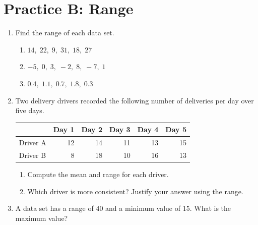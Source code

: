 \section*{Practice B: Range}
\begin{enumerate}[label=B\arabic*.,leftmargin=2.5em,itemsep=10pt]
  \item Find the range of each data set.
    \begin{enumerate}[label=(\alph*), itemsep=4pt]
      \item $14,\; 22,\; 9,\; 31,\; 18,\; 27$
      \item $-5,\; 0,\; 3,\; -2,\; 8,\; -7,\; 1$
      \item $0.4,\; 1.1,\; 0.7,\; 1.8,\; 0.3$
    \end{enumerate}

  \item Two delivery drivers recorded the following number
    of deliveries per day over five days.
    \begin{center}
    \renewcommand{\arraystretch}{1.4}
    \begin{tabular}{lrrrrr}
    \toprule
    & Day 1 & Day 2 & Day 3 & Day 4 & Day 5 \\
    \midrule
    Driver A & 12 & 14 & 11 & 13 & 15 \\
    Driver B & 8  & 18 & 10 & 16 & 13 \\
    \bottomrule
    \end{tabular}
    \end{center}
    \begin{enumerate}[label=(\alph*), itemsep=4pt]
      \item Compute the mean and range for each driver.
      \item Which driver is more consistent?
        Justify your answer using the range.
    \end{enumerate}

  \item A data set has a range of $40$ and a minimum value
    of $15$. What is the maximum value?

\end{enumerate}

\clearpage
